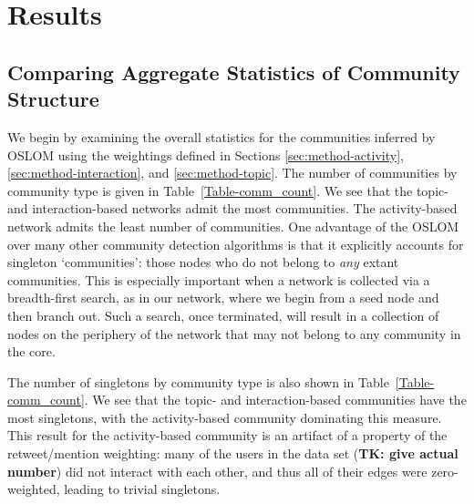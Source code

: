 \section{Results}

\subsection{Comparing Aggregate Statistics of Community Structure}

We begin by examining the overall statistics for the communities inferred by OSLOM using the weightings defined in Sections \ref{sec:method-activity}, \ref{sec:method-interaction}, and \ref{sec:method-topic}. The number of communities by community type is given in Table~\ref{Table-comm_count}. We see that the topic- and interaction-based networks admit the most communities. The activity-based network admits the least number of communities.  One advantage of the OSLOM over many other community detection algorithms is that it explicitly accounts for singleton `communities': those nodes who do not belong to \emph{any} extant communities. This is especially important when a network is collected via a breadth-first search, as in our network, where we begin from a seed node and then branch out. Such a search, once terminated, will result in a collection of nodes on the periphery of the network that may not belong to any community in the core.


The number of singletons by community type is also shown in Table~\ref{Table-comm_count}. We see that the topic- and interaction-based communities have the most singletons, with the activity-based community dominating this measure. This result for the activity-based community is an artifact of a property of the retweet/mention weighting: many of the users in the data set (\textbf{TK: give actual number}) did not interact with each other, and thus all of their edges were zero-weighted, leading to trivial singletons.


